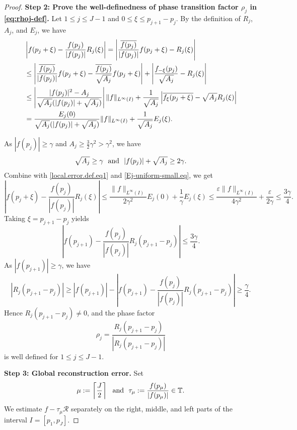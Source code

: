 \documentclass[11pt, reqno]{amsart}
\numberwithin{equation}{section}
\begin{document}
\begin{proof}
\smallskip
\noindent \textbf{Step 2: Prove the well-definedness of phase transition factor $\rho_j$ in \eqref{eq:rhoj-def}.}
  Let $1\le j\le J-1$ and $0\le \xi\le p_{j+1}-p_j$. By the definition of $R_j$, $A_j$, and $E_j$, we have
    \begin{align*}%
        {}& \left| f(p_j + \xi)  - \frac{f(p_j)}{|f(p_j)|} R_j(\xi) \right|  = \left| \frac{\overline{f(p_j)}}{|f(p_j)|} f(p_j + \xi) - R_j(\xi) \right| \notag\\
       {}&  \le \left| \frac{\overline{f(p_j)}}{|f(p_j)|} f(p_j + \xi) - \frac{\overline{f(p_j)}}{\sqrt{A_j}}f(p_j+\xi)\right|+
\left|\frac{f_{-\xi}(p_j)}{\sqrt{A_j}} - R_j(\xi) \right| \notag\\
       {}&  \le \left| \frac{|f(p_j)|^2 - A_j}{\sqrt{A_j} (|f(p_j)| + \sqrt{A_j})} \right| \|f\|_{L^{\infty} (I)} + \frac{1}{\sqrt{A_j}} \left|\overline{f_\xi(p_j + \xi)} - \sqrt{A_j} R_j(\xi) \right| \notag\\
       {}&  =   \frac{E_j(0)}{\sqrt{A_j} (|f(p_j)| + \sqrt{A_j})}  \|f\|_{L^{\infty} (I)} + \frac{1}{\sqrt{A_j}} E_j(\xi).
    \end{align*}
    
As $|f(p_j)|\ge \gamma$ and $A_j\ge \frac{3}{2}\gamma^2>\gamma^2$, 
we have 
$$ \sqrt{A_j}\ge \gamma \ \ {\rm and} \ \ |f(p_j)|+\sqrt{A_j}\ge 2\gamma.$$  
Combine with \eqref{local.error.def.eq1} and \eqref{Ej-uniform-small.eq},  
we get
\begin{equation}\label{eq38}
\left|f(p_j+\xi)-\frac{f(p_j)}{|f(p_j)|}R_j(\xi)\right| \le \frac{\|f\|_{L^\infty(I)}}{2\gamma^2}E_j(0) +\frac{1}{\gamma}E_j(\xi) \le \frac{\varepsilon\|f\|_{L^\infty(I)}}{4\gamma^2} +\frac{\varepsilon}{2\gamma} \le\frac{3\gamma}{4}.
\end{equation}
Taking $\xi=p_{j+1}-p_j$ yields 
$$\left| f(p_{j+1})-\frac{f(p_j)}{|f(p_j)|}R_j(p_{j+1}-p_j)\right|\le \frac{3\gamma}{4}.$$ 
As $|f(p_{j+1})|\ge \gamma$, we have 
$$|R_j(p_{j+1}-p_j)|\ge  |f(p_{j+1})| - \left| f(p_{j+1}) - \frac{f(p_j)}{|f(p_j)|} R_j(p_{j+1} - p_j) \right|\ge \frac{\gamma}{4}.$$
Hence $R_j(p_{j+1}-p_j)\neq0$, and the phase factor
$$ \rho_j=\frac{R_j(p_{j+1}-p_j)}{|R_j(p_{j+1}-p_j)|} $$
is well defined for $1\le j\le J-1$.


 \smallskip
\noindent\textbf{Step 3: Global reconstruction error.}
Set
$$ \mu:=\left\lceil\frac{J}{2}\right\rceil \ \ {\rm and } \ \ \tau_\mu:=\frac{f(p_\mu)}{|f(p_\mu)|}\in\mathbb T. $$ 
We estimate $f-\tau_\mu\mathcal R$ separately on the right, middle, and left parts of the interval $I=[p_1,p_J]$. 



\end{proof}
\end{document}
